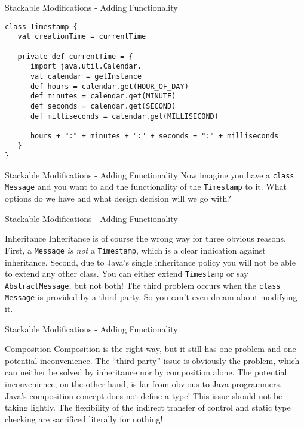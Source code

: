 \begin{frame}[fragile]{Stackable Modifications - Adding Functionality}
\begin{lstlisting}
class Timestamp {
   val creationTime = currentTime
   
   private def currentTime = {
      import java.util.Calendar._
      val calendar = getInstance
      def hours = calendar.get(HOUR_OF_DAY)
      def minutes = calendar.get(MINUTE)
      def seconds = calendar.get(SECOND)
      def milliseconds = calendar.get(MILLISECOND)
      
      hours + ":" + minutes + ":" + seconds + ":" + milliseconds
   }
}
\end{lstlisting}
\end{frame}

\begin{frame}[fragile]{Stackable Modifications - Adding Functionality}
Now imagine you have a \lstinline!class Message! and you want to add the
functionality of the \lstinline!Timestamp! to it. What options do we have and
what design decision will we go with?
\end{frame}

\begin{frame}[fragile]{Stackable Modifications - Adding Functionality}
\begin{alertblock}{Inheritance}
Inheritance is of course the wrong way for three obvious reasons. First, a
\lstinline!Message! \emph{is not} a \lstinline!Timestamp!, which is a clear indication against
inheritance. Second, due to Java's single inheritance policy you will not be
able to extend any other class. You can either extend \lstinline!Timestamp! or say
\lstinline!AbstractMessage!, but not both! The third problem occurs when the
\lstinline!class Message! is provided by a third party. So you can't even dream
about modifying it.
\end{alertblock}
\end{frame}

\begin{frame}[fragile]{Stackable Modifications - Adding Functionality}
\begin{block}{Composition}
Composition is the right way, but it still has one problem and one potential
inconvenience. The ``third party'' issue is obviously the problem, which
can neither be solved by inheritance nor by composition alone.
The potential inconvenience, on the other hand, is far from obvious to Java
programmers. Java's composition concept \alert{does not define a type}! This
issue should not be taking lightly. The flexibility of the indirect transfer of
control and static type checking are sacrificed literally for nothing!
\end{block}
\end{frame}

